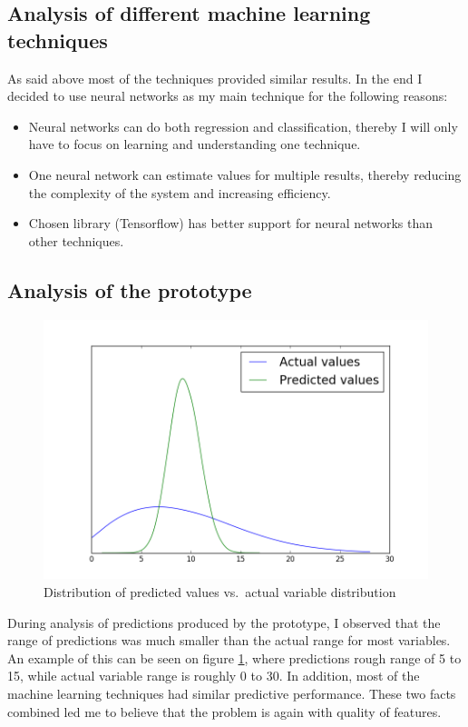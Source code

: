 \documentclass[12pt,a4paper]{book}
\begin{document}
\subsection{Analysis of different machine learning techniques}
As said above most of the techniques provided similar results.
In the end I decided to use neural networks as my main technique for the following reasons:
\begin{itemize}
\item Neural networks can do both regression and classification, thereby I will only have to focus on learning and understanding one technique.
\item One neural network can estimate values for multiple results, thereby reducing the complexity of the system and increasing efficiency.
\item Chosen library (Tensorflow) has better support for neural networks than other techniques.
\end{itemize}

\subsection{Analysis of the prototype}
\begin{figure}[ht]
\centering
\includegraphics[scale=0.5]{predicted_assists}
\caption{Distribution of predicted values vs.\ actual variable distribution}
\label{fig:variablerange}
\end{figure}
During analysis of predictions produced by the prototype, I observed that the range of predictions was much smaller than the actual range for most variables.
An example of this can be seen on figure \ref{fig:variablerange}, where predictions rough range of 5 to 15, while actual variable range is roughly 0 to 30.
In addition, most of the machine learning techniques had similar predictive performance.
These two facts combined led me to believe that the problem is again with quality of features.
\end{document}
